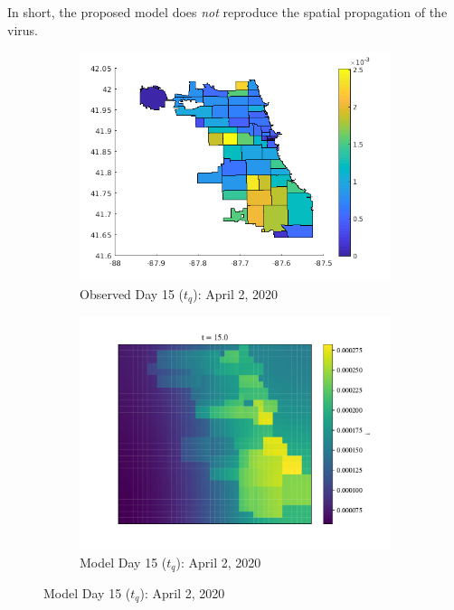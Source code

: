 \documentclass[11pt]{article}
\begin{document}
		In short, the proposed model does \textit{not} reproduce the spatial propagation of the virus.
		\begin{figure}[H]
			\centering
			\begin{subfigure}{0.5\textwidth}
				\includegraphics[width=\textwidth]{tq-cases}
				\caption{Observed Day 15 ($t_q$): April 2, 2020}
			\end{subfigure}%
			\begin{subfigure}{0.5\textwidth}
				\includegraphics[width=\textwidth]{infected_15}
				\caption{Model Day 15 ($t_q$): April 2, 2020}
			\end{subfigure}
		

\end{figure}
\end{document}
